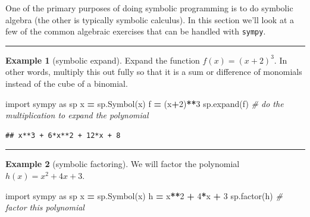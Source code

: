 \documentclass[
]{book}
\newenvironment{Shaded}{\begin{snugshade}}{\end{snugshade}}
\newcommand{\CommentTok}[1]{\textcolor[rgb]{0.56,0.35,0.01}{\textit{#1}}}
\newcommand{\DecValTok}[1]{\textcolor[rgb]{0.00,0.00,0.81}{#1}}
\newcommand{\ImportTok}[1]{#1}
\newcommand{\NormalTok}[1]{#1}
\newcommand{\OperatorTok}[1]{\textcolor[rgb]{0.81,0.36,0.00}{\textbf{#1}}}
\newcommand{\StringTok}[1]{\textcolor[rgb]{0.31,0.60,0.02}{#1}}
\theoremstyle{definition}
\theoremstyle{definition}
\newtheorem{example}{Example}[chapter]
\theoremstyle{definition}
\theoremstyle{remark}
\begin{document}
One of the primary purposes of doing symbolic programming is to do symbolic algebra (the other is typically symbolic calculus). In this section we'll look at a few of the common algebraic exercises that can be handled with \texttt{sympy}.

\begin{center}\rule{0.5\linewidth}{0.5pt}\end{center}

\begin{example}[symbolic expand]
\protect\hypertarget{exm:unnamed-chunk-779}{}{\label{exm:unnamed-chunk-779} {} }Expand the function \(f(x) = (x+2)^3\). In other words, multiply this out fully so that it is a sum or difference of monomials instead of the cube of a binomial.
\end{example}

\begin{Shaded}
\begin{Highlighting}[]
\ImportTok{import}\NormalTok{ sympy }\ImportTok{as}\NormalTok{ sp}
\NormalTok{x }\OperatorTok{=}\NormalTok{ sp.Symbol(}\StringTok{\textquotesingle{}x\textquotesingle{}}\NormalTok{)}
\NormalTok{f }\OperatorTok{=}\NormalTok{ (x}\OperatorTok{+}\DecValTok{2}\NormalTok{)}\OperatorTok{**}\DecValTok{3}
\NormalTok{sp.expand(f) }\CommentTok{\# do the multiplication to expand the polynomial}
\end{Highlighting}
\end{Shaded}

\begin{verbatim}
## x**3 + 6*x**2 + 12*x + 8
\end{verbatim}

\begin{center}\rule{0.5\linewidth}{0.5pt}\end{center}

\begin{example}[symbolic factoring]
\protect\hypertarget{exm:unnamed-chunk-781}{}{\label{exm:unnamed-chunk-781} {} }We will factor the polynomial \(h(x) = x^2 + 4x + 3\).
\end{example}

\begin{Shaded}
\begin{Highlighting}[]
\ImportTok{import}\NormalTok{ sympy }\ImportTok{as}\NormalTok{ sp}
\NormalTok{x }\OperatorTok{=}\NormalTok{ sp.Symbol(}\StringTok{\textquotesingle{}x\textquotesingle{}}\NormalTok{)}
\NormalTok{h }\OperatorTok{=}\NormalTok{ x}\OperatorTok{**}\DecValTok{2} \OperatorTok{+} \DecValTok{4}\OperatorTok{*}\NormalTok{x }\OperatorTok{+} \DecValTok{3}
\NormalTok{sp.factor(h) }\CommentTok{\# factor this polynomial}
\end{Highlighting}
\end{Shaded}
\end{document}

